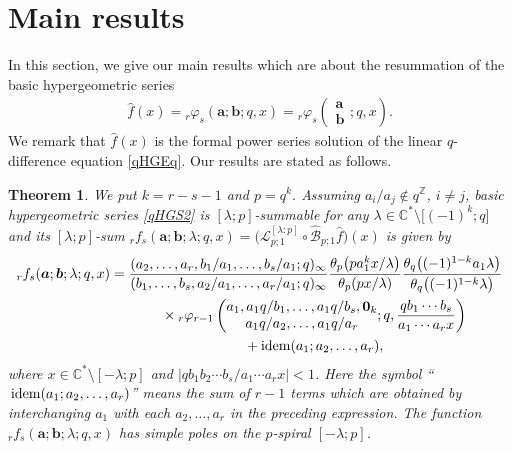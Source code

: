 \documentclass[pdftex]{sigma}
\numberwithin{equation}{section}
\newtheorem{Theorem}{Theorem}[section]
\newcommand{\idem}{{\rm idem}}
\begin{document}
\section{Main results}\label{Section:Main Results}
In this section, we give our main results which are about the resummation of the basic hypergeometric series
\begin{gather}\label{qHGS2}
\hat{f}(x)={}_r\varphi_s(\bm{a};\bm{b};q,x)={}_r\varphi_s\left( \begin{matrix}\bm{a}\\ \bm{b} \end{matrix};q,x\right).
\end{gather}
We remark that $\hat{f}(x)$ is the formal power series solution of the linear $q$-difference equation \eqref{qHGEq}. Our results are stated as follows.
\begin{Theorem}\label{Theorem:Main1}
We put $k=r-s-1$ and $p=q^k$. Assuming $a_i/a_j\notin q^{\mathbb{Z}}$, $i\neq j$, basic hypergeometric series \eqref{qHGS2} is $[\lambda;p]$-summable for any $\lambda\in\mathbb{C}^*\setminus\big[(-1)^{k};q\big]$ and its $[\lambda;p]$-sum ${}_rf_s(\bm{a};\bm{b};\lambda;q,x)=\big(\mathcal{L}_{p;1}^{[\lambda:p]}\circ\mathcal{\hat{B}}_{p;1}\hat{f}\big)(x)$ is given by
\begin{gather}
{}_rf_s(\bm{a};\bm{b};\lambda;q,x) =\frac{(a_2,\ldots,a_r,b_1/a_1,\ldots,b_{s}/a_1;q)_\infty}{(b_1,\ldots,b_{s},a_2/a_1,\ldots,a_r/a_1;q)_\infty}\frac{\theta_{p}\big(pa_1^kx/\lambda\big)}{\theta_{p}(px/\lambda)}
\frac{\theta_q\big((-1)^{1-k}a_1\lambda\big)}{\theta_q\big((-1)^{1-k}\lambda\big)}\nonumber\\
\hphantom{{}_rf_s(\bm{a};\bm{b};\lambda;q,x) =}{}
\times{}_r\varphi_{r-1}\left(\begin{matrix}a_1,a_1q/b_1,\ldots,a_1q/b_s,\bm{0}_k\\a_1q/a_2,\ldots,a_1q/a_r
\end{matrix} ;q,\frac{qb_1\cdots b_s}{a_1\cdots a_rx}\right)\nonumber\\
\hphantom{{}_rf_s(\bm{a};\bm{b};\lambda;q,x) =}{}
+\idem(a_1;a_2,\ldots,a_r),\label{Main1}
\end{gather}
where $x\in\mathbb{C}^*\setminus[-\lambda;p]$ and $|qb_1b_2\cdots b_s/a_1\cdots a_rx|<1$. Here the symbol ``$\,\idem(a_1;a_2,\ldots,a_r)$'' means the sum of $r-1$ terms which are obtained by interchanging $a_1$ with each $a_2,\ldots,a_r$ in the preceding expression.
The function ${}_rf_s(\bm{a};\bm{b};\lambda;q,x)$ has simple poles on the $p$-spiral $[-\lambda;p]$.
\end{Theorem}
\end{document}
